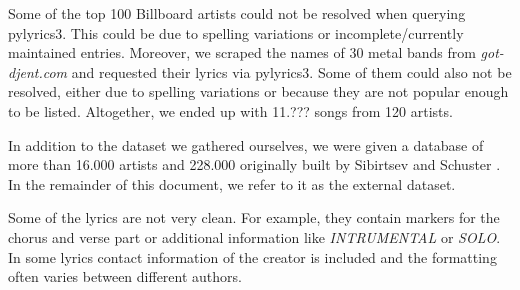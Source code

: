 \documentclass[10pt,a4paper]{article}
\begin{document}
	Some of the top 100 Billboard artists could not be resolved when querying pylyrics3. This could be due to spelling variations or incomplete/currently maintained entries. Moreover, we scraped the names of 30 metal bands from \textit{got-djent.com} and requested their lyrics via pylyrics3. Some of them could also not be resolved, either due to spelling variations or because they are not popular enough to be listed. Altogether, we ended up with 11.??? songs from 120 artists.

	In addition to the dataset we gathered ourselves, we were given a database of more than 16.000 artists and 228.000 originally built by Sibirtsev and Schuster \cite{sibirtsevschuster}. In the remainder of this document, we refer to it as the external dataset.
	
	Some of the lyrics are not very clean. For example, they contain markers for the chorus and verse part or additional information like \textit{INTRUMENTAL} or \textit{SOLO}. In some lyrics contact information of the creator is included and the formatting often varies between different authors.
	
\end{document}
